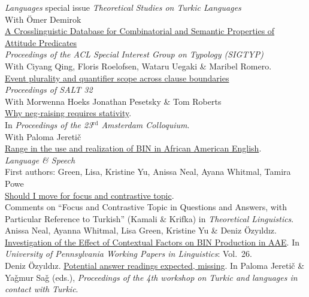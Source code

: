 \documentclass[11pt, a4paper]{article} %
\newcommand{\years}[1]{\marginnote{\scriptsize #1}} %
\newcommand{\me}{Deniz \"Ozy\i{}ld\i{}z}
\newcommand{\btit}{\textit}
\begin{document}
\emph{Languages} special issue \emph{Theoretical Studies on Turkic Languages} \\
With \"Omer Demirok \\[.25em]
\years{} \href{https://aclanthology.org/2023.sigtyp-1.7/}{A Crosslinguistic
Database for Combinatorial and Semantic Properties of Attitude Predicates} \\
\emph{Proceedings of the ACL Special Interest Group on Typology (SIGTYP)} \\
With Ciyang Qing, Floris Roelofsen, Wataru Uegaki \& Maribel Romero. \\[.25em]
\years{2022}
\href{https://journals.linguisticsociety.org/proceedings/index.php/SALT/article/view/32.023}{Event
plurality and quantiﬁer scope across clause boundaries} \\
\emph{Proceedings of SALT 32} \\
With Morwenna Hoeks Jonathan Pesetsky \& Tom Roberts \\[.25em]
\href{https://deniz.fr/pdfs/jeretic-ozyildiz-ACproceedings.pdf}{Why neg-raising
requires stativity}. \\ 
In  \emph{Proceedings of the 23$^{\text{rd}}$ Amsterdam Colloquium}. \\ 
With Paloma Jereti\v{c} \\[.25em]
\href{https://www.ncbi.nlm.nih.gov/pmc/articles/PMC9749017/}{Range in the use
and realization of BIN in African American English}. \\ 
\emph{Language \& Speech} \\
First authors: Green, Lisa, Kristine Yu, Anissa Neal, Ayana Whitmal, Tamira Powe
\\[.25em]
\years{2020} \href{http://deniz.fr/pdfs/2020-ozyildiz-on-kk.pdf}{Should I move
for focus and contrastive topic}. \\ 
Comments on ``Focus and Contrastive Topic in Questions and Answers, with Particular Reference to Turkish'' (Kamali \& Krifka) in \emph{Theoretical Linguistics}.\\[.25em]
\years{} Anissa Neal, Ayanna Whitmal, Lisa Green, Kristine Yu \& Deniz \"Ozy\i{}ld\i{}z. \href{https://repository.upenn.edu/pwpl/vol26/iss2/12/}{Investigation of the Effect of Contextual Factors on BIN Production in AAE}. In \btit{University of Pennsylvania Working Papers in Linguistics}: Vol.\ 26.\\[.25em]
\years{2019} \me. \href{https://semanticsarchive.net/Archive/TQzZWUwO/}{Potential answer readings expected, missing}. In Paloma Jereti\v{c} \& Ya\v{g}mur Sa\v{g} (eds.), \btit{Proceedings of the 4th workshop on Turkic and languages in contact with Turkic}.\\[.25em]
\end{document}
